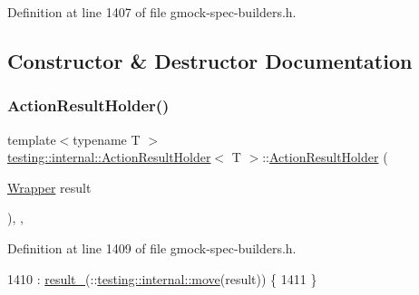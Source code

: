 Definition at line 1407 of file gmock-\/spec-\/builders.\+h.



\subsection{Constructor \& Destructor Documentation}
\mbox{\label{classtesting_1_1internal_1_1ActionResultHolder_abd600b0ffabe799853682d791cb24c77}} 
\subsubsection{\texorpdfstring{Action\+Result\+Holder()}{ActionResultHolder()}}
{\footnotesize\ttfamily template$<$typename T $>$ \\
\hyperlink{classtesting_1_1internal_1_1ActionResultHolder}{testing\+::internal\+::\+Action\+Result\+Holder}$<$ T $>$\+::\hyperlink{classtesting_1_1internal_1_1ActionResultHolder}{Action\+Result\+Holder} (\begin{DoxyParamCaption}\item[{\hyperlink{classtesting_1_1internal_1_1ActionResultHolder_aa483b488570efd86657857501dce2b1d}{Wrapper}}]{result }\end{DoxyParamCaption})\hspace{0.3cm}{\ttfamily [inline]}, {\ttfamily [explicit]}, {\ttfamily [private]}}



Definition at line 1409 of file gmock-\/spec-\/builders.\+h.


\begin{DoxyCode}
1410       : \hyperlink{classtesting_1_1internal_1_1ActionResultHolder_a76fc150d4247a041353cdd859976198b}{result\_}(::\hyperlink{namespacetesting_1_1internal_a0f6d06bf8c3093b9c22bb08723db201e}{testing::internal::move}(result)) \{
1411   \}
\end{DoxyCode}


